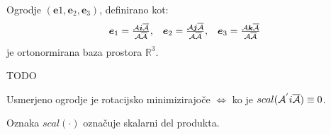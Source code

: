 \documentclass[mat1]{fmfdelo}
\newcommand{\R}{\mathbb R}
\newcommand{\ii}{\boldsymbol i}
\newcommand{\jj}{\boldsymbol j}
\newcommand{\kk}{\boldsymbol k}
\newcommand{\e}{\boldsymbol e}
\newcommand{\A}{\mathcal A}
\begin{document}
\begin{trditev}
Ogrodje $(\e1,\e_2,\e_3)$, definirano kot: 
\begin{equation*}
\begin{array}{c c c}
\e_1 = \frac{\A\ii\overline{\A}}{\A\overline{\A}}, &
\e_2 = \frac{\A\jj\overline{\A}}{\A\overline{\A}}, &
\e_3 = \frac{\A\kk\overline{\A}}{\A\overline{\A}}
\end{array}
\end{equation*}
je ortonormirana baza prostora $\R^3$.
\end{trditev}
\begin{dokaz}
TODO
\end{dokaz}
\begin{trditev}
	Usmerjeno ogrodje je rotacijsko minimizirajoče $\Leftrightarrow$ ko je $scal(\A^{'} \\i\overline{\A})\equiv0$.
\end{trditev}
\begin{opomba}
	Oznaka $scal(\cdot)$ označuje skalarni del produkta.
\end{opomba}
\end{document}
